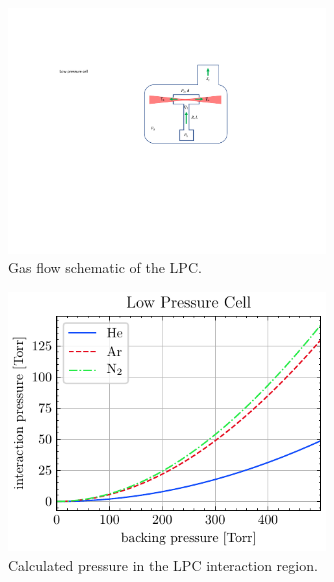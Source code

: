 \begin{figure}
	\centering
	\includegraphics[width=0.75\textwidth]{figures/chap3/LPC_schematic.pdf}
	\caption{Gas flow schematic of the LPC.}
	\label{fig:LPC_schematic}
\end{figure}

\begin{figure}
	\centering
	\includegraphics[width=0.75\textwidth]{figures/chap3/LPC_interaction_p.pdf}
	\caption{Calculated pressure in the LPC interaction region.}
	\label{fig:LPC_interaction_p}
\end{figure}

